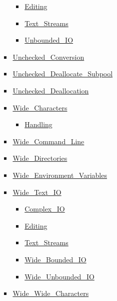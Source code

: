 \begin{multicols*}{\columnnr}
\begin{scriptsize}
\begin{itemize}[leftmargin=0mm]
\begin{itemize}[leftmargin=5mm]
\begin{itemize}[leftmargin=5mm]
\begin{itemize}[leftmargin=5mm]
	  \item[] \href{http://www.ada-auth.org/standards/22rm/html/RM-F-3-3.html}{Editing}
	  \item[] \href{http://www.ada-auth.org/standards/22rm/html/RM-A-12-2.html}{Text\_Streams}
	  \item[] \href{http://www.ada-auth.org/standards/22rm/html/RM-A-10-12.html}{Unbounded\_IO}
	  \end{itemize}
	\item[] \href{http://www.ada-auth.org/standards/22rm/html/RM-13-9.html}{Unchecked\_Conversion}
	\item[] \href{http://www.ada-auth.org/standards/22rm/html/RM-13-11-5.html}{Unchecked\_Deallocate\_Subpool}
	\item[] \href{http://www.ada-auth.org/standards/22rm/html/RM-13-11-2.html}{Unchecked\_Deallocation}
	\item[] \href{http://www.ada-auth.org/standards/22rm/html/RM-A-3-1.html}{Wide\_Characters}
	  \begin{itemize}[leftmargin=5mm]
	  \item[] \href{http://www.ada-auth.org/standards/22rm/html/RM-A-3-5.html}{Handling}
	  \end{itemize}
	\item[] \href{http://www.ada-auth.org/standards/22rm/html/RM-A-15-1.html}{Wide\_Command\_Line}
	\item[] \href{http://www.ada-auth.org/standards/22rm/html/RM-A-16-2.html}{Wide\_Directories}
	\item[] \href{http://www.ada-auth.org/standards/22rm/html/RM-A-17-1.html}{Wide\_Environment\_Variables}
	\item[] \href{http://www.ada-auth.org/standards/22rm/html/RM-A-11.html}{Wide\_Text\_IO}
	  \begin{itemize}[leftmargin=5mm]
	  \item[] \href{http://www.ada-auth.org/standards/22rm/html/RM-G-1-4.html}{Complex\_IO}
	  \item[] \href{http://www.ada-auth.org/standards/22rm/html/RM-F-3-4.html}{Editing}
	  \item[] \href{http://www.ada-auth.org/standards/22rm/html/RM-A-12-3.html}{Text\_Streams}
	  \item[] \href{http://www.ada-auth.org/standards/22rm/html/RM-A-11.html}{Wide\_Bounded\_IO}
	  \item[] \href{http://www.ada-auth.org/standards/22rm/html/RM-A-11.html}{Wide\_Unbounded\_IO}
	  \end{itemize}
	\item[] \href{http://www.ada-auth.org/standards/22rm/html/RM-A-3-1.html}{Wide\_Wide\_Characters}

\end{itemize}
\end{itemize}
\end{itemize}
\end{scriptsize}
\end{multicols*}
